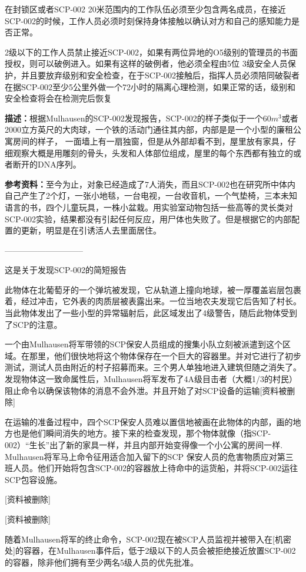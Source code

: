 \documentclass[openany,a4paper]{book} %
\begin{document}
在封锁区或者SCP-002 20米范围内的工作队伍必须至少包含两名成员，在接近SCP-002的时候，工作人员必须时刻保持身体接触以确认对方和自己的感知能力是否正常。\vspace{12pt}

2级以下的工作人员禁止接近SCP-002，如果有两位异地的O5级别的管理员的书面授权，则可以破例进入。如果有这样的破例者，他必须全程由5位 3级安全人员保护，并且要放弃级别和安全检查，在于SCP-002接触后，指挥人员必须陪同破裂者在据SCP-002至少5公里外做一个72小时的隔离心理检测，如果正常的话，级别和安全检查将会在检测完后恢复\vspace{12pt}

\textbf{描述：}根据Mulhausen的SCP-002发现报告，SCP-002的样子类似于一个60$m^3$或者2000立方英尺的大肉球，一个铁的活动门通往其内部，内部是是一个小型的廉租公寓房间的样子， 一面墙上有一扇独窗，但是从外部却看不到，屋里放有家具，仔细观察大概是用雕刻的骨头，头发和人体部位组成，屋里的每个东西都有独立的或者断开的DNA序列。\vspace{12pt}

\textbf{参考资料：}至今为止，对象已经造成了7人消失，而且SCP-002也在研究所中体内自己产生了2个灯，一张小地毯，一台电视，一台收音机，一个气垫椅，三本未知语言的书，四个儿童玩具，一株小盆栽。用实验室动物包括一些高等的灵长类对SCP-002实验，结果都没有引起任何反应，用尸体也失败了。但是根据它的内部配置的更新，明显是在引诱活人去里面居住。\vspace{12pt}

-----------------------------\vspace{12pt}

这是关于发现SCP-002的简短报告\vspace{12pt}

此物体在北葡萄牙的一个弹坑被发现，它从轨道上撞向地球，被一厚覆盖岩层包裹着，经过冲击，它外表的肉质层被表露出来。一位当地农夫发现它后告知了村长。当此物体发出了一些小型的异常辐射后，此区域发出了4级警告，随后此物体受到了SCP的注意。\vspace{12pt}

一个由Mulhausen将军带领的SCP保安人员组成的搜集小队立刻被派遣到这个区域。在那里，他们很快地将这个物体保存在一个巨大的容器里。并对它进行了初步测试，测试人员由附近的村子招募而来。三个男人单独地进入建筑但随之消失了。发现物体这一致命属性后，Mulhausen将军发布了4A级目击者（大概1/3的村民）阻止命令以确保该物体的消息不会外泄。并且开始了对SCP设备的运输[资料被删除]\vspace{12pt}

在运输的准备过程中，四个SCP保安人员难以置信地被画在此物体的内部，画的地方也是他们瞬间消失的地方。接下来的检查发现，那个物体就像（指SCP-002）“生长”出了新的家具一样，并且内部开始变得像一个小公寓的房间一样. Mulhausen将军马上命令征用适合加入留下的SCP 保安人员的危害物质应对第三班人员。他们开始将包含SCP-002的容器放上待命中的运货船，并将SCP-002运往SCP包容设施。\vspace{12pt}

[资料被删除]\vspace{12pt}

[资料被删除]\vspace{12pt}

随着Mulhausen将军的终止命令，SCP-002现在被SCP人员监视并被带入在[机密处]的容器，在Mulhausen事件后，低于2级以下的人员会被拒绝接近放置SCP-002的容器，除非他们拥有至少两名5级人员的优先批准。
\end{document}

